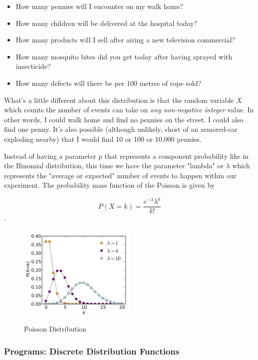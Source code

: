 \begin{itemize}
  \item How many pennies will I encounter on my walk home?
  \item How many children will be delivered at the hospital today?
  \item How many products will I sell after airing a new television commercial?
  \item How many mosquito bites did you get today after having sprayed with insecticide?
  \item How many defects will there be per 100 metres of rope sold?
\end{itemize}

What's a little different about this distribution is that the random variable $X$ which counts the number of events can take on \emph{any non-negative integer} value. In other words, I could walk home and find no pennies on the street. I could also find one penny. It's also possible (although unlikely, short of an armored-car exploding nearby) that I would find 10 or 100 or 10,000 pennies.

Instead of having a parameter p that represents a component probability like in the Binomial distribution, this time we have the parameter "lambda" or $\lambda$ which represents the "average or expected" number of events to happen within our experiment. The probability mass function of the Poisson is given by

\begin{equation}
  P(X=k)=\frac{e^{-\lambda}\lambda^k}{k!}
\end{equation}.


\begin{figure}
  \centering
  \includegraphics[width=0.5\textwidth]{../Images/Poisson_pmf.png}\\
  \caption{Poisson Distribution}
\end{figure}

\subsubsection{ Programs: Discrete Distribution Functions } 


